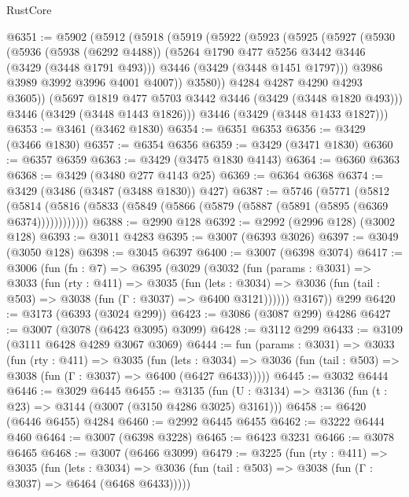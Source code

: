 \begin{lexlean}{RustCore}
\begin{coremodule}
@6351 := @5902
    (@5912
      (@5918
        (@5919
          (@5922
            (@5923
              (@5925
                (@5927
                  (@5930
                    (@5936
                      (@5938 (@6292 @4488))
                      (@5264 @1790 @477 @5256 @3442 @3446 (@3429 (@3448 @1791 @493)))
                      @3446
                      (@3429 (@3448 @1451 @1797)))
                    @3986
                    @3989
                    @3992
                    @3996
                    @4001
                    @4007))
                @3580))
            @4284
            @4287
            @4290
            @4293
            @3605))
        (@5697 @1819 @477 @5703 @3442 @3446 (@3429 (@3448 @1820 @493)))
        @3446
        (@3429 (@3448 @1443 @1826)))
      @3446
      (@3429 (@3448 @1433 @1827)))
@6353 := @3461 (@3462 @1830)
@6354 := @6351 @6353
@6356 := @3429 (@3466 @1830)
@6357 := @6354 @6356
@6359 := @3429 (@3471 @1830)
@6360 := @6357 @6359
@6363 := @3429 (@3475 @1830 @4143)
@6364 := @6360 @6363
@6368 := @3429 (@3480 @277 @4143 @25)
@6369 := @6364 @6368
@6374 := @3429 (@3486 (@3487 (@3488 @1830)) @427)
@6387 := @5746
    (@5771
      (@5812 (@5814 (@5816 (@5833 (@5849 (@5866 (@5879 (@5887 (@5891 (@5895 (@6369 @6374))))))))))))
@6388 := @2990 @128
@6392 := @2992 (@2996 @128) (@3002 @128)
@6393 := @3011 @4283
@6395 := @3007 (@6393 @3026)
@6397 := @3049 (@3050 @128)
@6398 := @3045 @6397
@6400 := @3007 (@6398 @3074)
@6417 := @3006
    (fun (fn : @7) =>
    @6395
      (@3029
        (@3032
          (fun (params : @3031) =>
          @3033
            (fun (rty : @411) =>
            @3035
              (fun (lets : @3034) =>
              @3036 (fun (tail : @503) => @3038 (fun (Γ : @3037) => @6400 @3121))))))
        @3167))
    @299
@6420 := @3173 (@6393 (@3024 @299))
@6423 := @3086 (@3087 @299) @4286
@6427 := @3007 (@3078 (@6423 @3095) @3099)
@6428 := @3112 @299
@6433 := @3109 (@3111 @6428 @4289 @3067 @3069)
@6444 := fun (params : @3031) =>
  @3033
    (fun (rty : @411) =>
    @3035
      (fun (lets : @3034) =>
      @3036 (fun (tail : @503) => @3038 (fun (Γ : @3037) => @6400 (@6427 @6433)))))
@6445 := @3032 @6444
@6446 := @3029 @6445
@6455 := @3135 (fun (U : @3134) => @3136 (fun (t : @23) => @3144 (@3007 (@3150 @4286 @3025) @3161)))
@6458 := @6420 (@6446 @6455) @4284
@6460 := @2992 @6445 @6455
@6462 := @3222 @6444 @460
@6464 := @3007 (@6398 @3228)
@6465 := @6423 @3231
@6466 := @3078 @6465
@6468 := @3007 (@6466 @3099)
@6479 := @3225
    (fun (rty : @411) =>
    @3035
      (fun (lets : @3034) =>
      @3036 (fun (tail : @503) => @3038 (fun (Γ : @3037) => @6464 (@6468 @6433)))))

\end{coremodule}
\end{lexlean}
